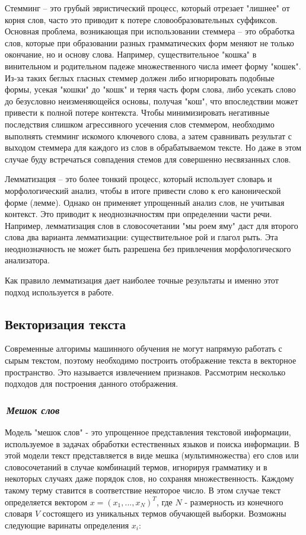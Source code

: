 \documentclass[12pt]{article}
\begin{document}
Стемминг -- это грубый эвристический процесс, который отрезает "лишнее" от корня слов, часто это приводит к потере словообразовательных суффиксов. Основная проблема, возникающая при использовании стеммера -- это обработка слов, которые при образовании разных грамматических форм меняют не только окончание, но и основу слова. Например, существительное "кошка" в винительном и родительном падеже множественного числа имеет форму "кошек". Из-за таких беглых гласных стеммер должен либо игнорировать подобные формы, усекая "кошки" до "кошк" и теряя часть форм слова, либо усекать слово до безусловно неизменяющейся основы, получая "кош", что впоследствии может привести к полной потере контекста. Чтобы минимизировать негативные последствия слишком агрессивного усечения слов стеммером, необходимо выполнять стемминг искомого ключевого слова, а затем сравнивать результат с выходом стеммера для каждого из слов в обрабатываемом тексте. Но даже в этом случае буду встречаться совпадения стемов для совершенно несвязанных слов.


Лемматизация -- это более тонкий процесс, который использует словарь и морфологический анализ, чтобы в итоге привести слово к его канонической форме (лемме). Однако он применяет упрощенный анализ слов, не учитывая контекст. Это приводит к неоднозначностям при определении части речи. Например, лемматизация слов в словосочетании "мы роем яму" даст для второго слова два варианта лемматизации: существительное рой и глагол рыть. Эта неоднозначность не может быть разрешена без привлечения морфологического анализатора.

Как правило лемматизация дает наиболее точные результаты и именно этот подход используется в работе.

\subsection*{Векторизация текста}
Современные алгоримы машинного обучения не могут напрямую работать с сырым текстом, поэтому необходимо построить отображение текста в векторное пространство. Это называется извлечением признаков. Рассмотрим несколько подходов для построения данного отображения.

\subsubsection*{\it\,Мешок слов}
Модель "мешок слов" - это упрощенное представления текстовой информации, используемое в задачах обработки естественных языков и поиска информации. В этой модели текст представляется в виде мешка (мультимножества) его слов или словосочетаний в случае комбинаций термов, игнорируя грамматику и в некоторых случаях даже порядок слов, но сохраняя множественность. Каждому такому терму ставится в соответствие некоторое число. В этом случае текст определяется вектором $x=(x_1, ..., x_N)^T$, где $N$ - размерность из конечного словаря $V$ состоящего из уникальных термов обучающей выборки. Возможны следующие варинаты определения $x_i$:
\end{document}
